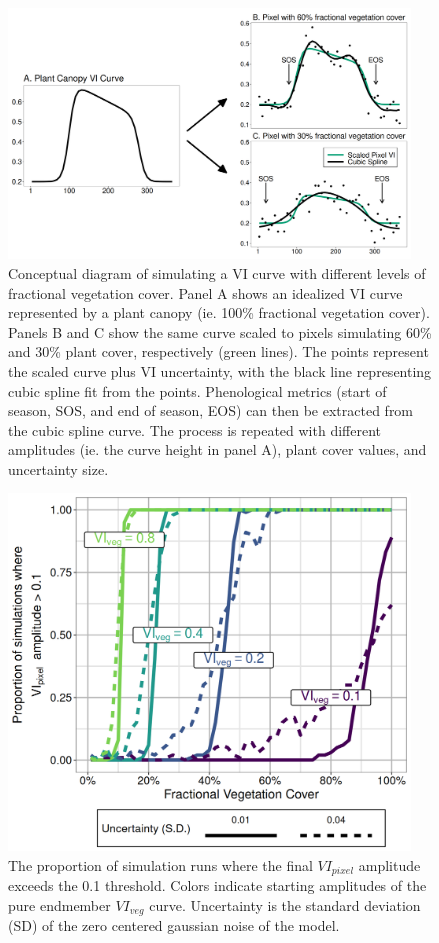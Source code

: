 \documentclass{article}
\begin{document}
\begin{figure}[h]
    \centering
    \includegraphics[width=0.95\textwidth]{figures/fig1_conceptual_vi_curve.png}
    \caption{Conceptual diagram of simulating a VI curve with different levels of fractional vegetation cover. Panel A shows an idealized VI curve represented by a plant canopy (ie. 100\% fractional vegetation cover). Panels B and C show the same curve scaled to pixels simulating 60\% and 30\% plant cover, respectively (green lines). The points represent the scaled curve plus VI uncertainty, with the black line representing cubic spline fit from the points. Phenological metrics (start of season, SOS, and end of season, EOS) can then be extracted from the cubic spline curve. The process is repeated with different amplitudes (ie. the curve height in panel A), plant cover values, and uncertainty size.}
    \label{fig1}
\end{figure}

\begin{figure}[h]
    \centering
    \includegraphics[width=0.95\textwidth]{figures/fig2_sim_detectability.png}
    \caption{The proportion of simulation runs where the final $VI_{pixel}$ amplitude exceeds the 0.1 threshold. Colors indicate starting amplitudes of the pure endmember $VI_{veg}$ curve. Uncertainty is the standard deviation (SD) of the zero centered gaussian noise of the model.}
    \label{fig2}
\end{figure}
\end{document}
